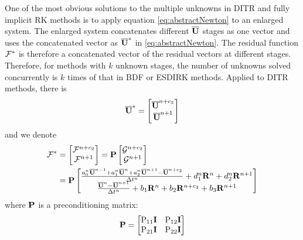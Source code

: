 One of the most obvious solutions to the multiple unknowns
in DITR and fully implicit RK methods is to apply
equation \eqref{eq:abstractNewton} to an enlarged
system.
The enlarged system concatenates different $\overline{\mathbf{U}}$
stages as one vector and uses the concatenated vector as
$\overline{\mathbf{U}}^*$ in \eqref{eq:abstractNewton}.
The residual function $\mathcal{F}^*$ is therefore a concatenated vector of
the residual vectors at different stages.
Therefore, for methods with $k$ unknown stages, the number of
unknowns solved concurrently is $k$ times of that in BDF or ESDIRK methods.
Applied to DITR methods, there is
\begin{equation}
    \overline{\mathbf{U}}^* = \begin{bmatrix}
        \overline{\mathbf{U}}^{n+c_2} \\
        \overline{\mathbf{U}}^{n+1}
    \end{bmatrix}
\end{equation}
and we denote
\begin{equation}
    \begin{aligned}
        \mathcal{F}^* & =\begin{bmatrix}
            \mathcal{F}^{n+c_2} \\
            \mathcal{F}^{n+1}
        \end{bmatrix} = \mathbf{P}\begin{bmatrix}
            \mathcal{G}^{n+c_2} \\
            \mathcal{G}^{n+1}
        \end{bmatrix} \\ & = \mathbf{P}\begin{bmatrix}
            \frac{a^n_0\overline{\mathbf{U}}^{n - 1} +
                a^n_1\overline{\mathbf{U}}^{n} +
                a^n_2\overline{\mathbf{U}}^{n + 1} - \overline{\mathbf{U}}^{n+c_2}}{{\Delta} t^n}
            +
            d^n_1\mathbf{R}^{n} +
            d^n_2\mathbf{R}^{n + 1}
            \\
            \frac{\overline{\mathbf{U}}^{n} - \overline{\mathbf{U}}^{n+1}}{{\Delta} t^n}  +
            b_1 \mathbf{R}^n +
            b_2 \mathbf{R}^{n+c_2} +
            b_3 \mathbf{R}^{n+1}
        \end{bmatrix}
        \label{eq:DITRFFDef}
    \end{aligned}
\end{equation}
where $\mathbf{P}$ is a preconditioning matrix:
\begin{equation}
    \mathbf{P} = \begin{bmatrix}
        \mathrm{P}_{11}\mathbf{I} & \mathrm{P}_{12}\mathbf{I} \\
        \mathrm{P}_{21}\mathbf{I} & \mathrm{P}_{22}\mathbf{I} \\
    \end{bmatrix}
\end{equation}
